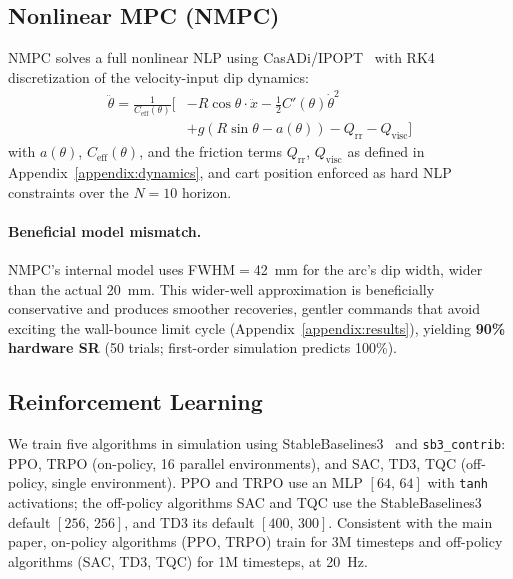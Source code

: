 \subsection{Nonlinear MPC (NMPC)}

NMPC solves a full nonlinear NLP using CasADi/IPOPT~\cite{casadi}
with RK4 discretization of the velocity-input dip dynamics:
\begin{equation}
\begin{aligned}
  \ddot\theta = \frac{1}{C_\mathrm{eff}(\theta)}\Big[
    &-R\cos\theta \cdot \ddot x - \tfrac{1}{2}C'(\theta)\dot\theta^2 \\
    &+ g(R\sin\theta - a(\theta)) - Q_\text{rr} - Q_\text{visc} \Big]
\end{aligned}
\end{equation}
with $a(\theta)$, $C_\mathrm{eff}(\theta)$, and the friction terms $Q_\text{rr}$,
$Q_\text{visc}$ as defined in Appendix~\ref{appendix:dynamics}, and cart
position enforced as hard NLP constraints over the $N{=}10$ horizon.

\paragraph{Beneficial model mismatch.}
NMPC's internal model uses FWHM$=$42~mm for the arc's dip width, wider
than the actual 20~mm. This wider-well approximation is beneficially
conservative and produces smoother recoveries, gentler commands that
avoid exciting the wall-bounce limit cycle
(Appendix~\ref{appendix:results}), yielding \textbf{90\% hardware SR}
(50 trials; first-order simulation predicts 100\%).

\subsection{Reinforcement Learning}

We train five algorithms in simulation using
StableBaselines3~\cite{stable_baselines3} and \texttt{sb3\_contrib}:
PPO, TRPO (on-policy, 16 parallel environments), and
SAC, TD3, TQC (off-policy, single environment).
PPO and TRPO use an MLP $[64,\,64]$ with \texttt{tanh} activations; the
off-policy algorithms SAC and TQC use the StableBaselines3 default
$[256,\,256]$, and TD3 its default $[400,\,300]$. Consistent with
the main paper, on-policy algorithms (PPO, TRPO) train for 3M
timesteps and off-policy algorithms (SAC, TD3, TQC) for 1M
timesteps, at 20~Hz.

